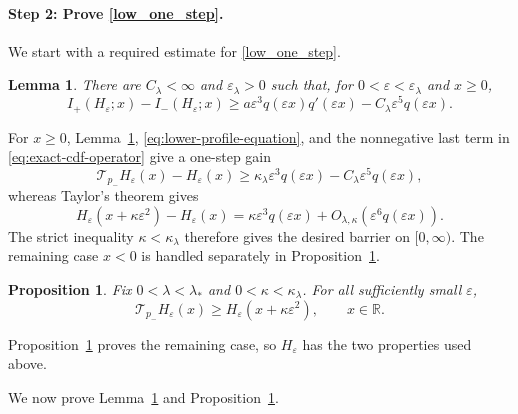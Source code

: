 \documentclass[12pt]{amsart}
\numberwithin{equation}{section}
\theoremstyle{plain}
\newtheorem{proposition}[theorem]{Proposition}
\newtheorem{lemma}[theorem]{Lemma}
\theoremstyle{definition}
\begin{document}
\paragraph*{Step 2: Prove \eqref{low_one_step}.}
We start with a required  estimate for \eqref{low_one_step}.

\begin{lemma}
\label{lem:hard-edge-consistency}
There are $C_{\lambda}<\infty$ and $\varepsilon_{\lambda}>0$ such that, for
$0<\varepsilon<\varepsilon_{\lambda}$ and $x\ge0$,
\begin{equation}
 I_+(H_\varepsilon;x)-I_-(H_\varepsilon;x)
 \ge a\varepsilon^3q(\varepsilon x)q'(\varepsilon x)
      -C_{\lambda}\varepsilon^5q(\varepsilon x).
 \label{eq:hard-edge-one-sided-consistency}
\end{equation}
\end{lemma}

For $x\ge0$, Lemma~\ref{lem:hard-edge-consistency},
\eqref{eq:lower-profile-equation}, and the nonnegative last term in
\eqref{eq:exact-cdf-operator} give a one-step gain
\[
 \mathcal T_{p_-}H_\varepsilon(x)-H_\varepsilon(x)
 \ge \kappa_{\lambda}\varepsilon^3q(\varepsilon x)
      -C_{\lambda}\varepsilon^5q(\varepsilon x),
\]
whereas Taylor's theorem gives
\[
 H_\varepsilon(x+\kappa\varepsilon^2)-H_\varepsilon(x)
 =\kappa\varepsilon^3q(\varepsilon x)
  +O_{\lambda,\kappa}(\varepsilon^6q(\varepsilon x)).
\]
The strict inequality $\kappa<\kappa_{\lambda}$ therefore gives the desired
barrier on $[0,\infty)$. The remaining case $x<0$ is handled separately in
Proposition~\ref{prop:hard-edge-barrier}.

\begin{proposition}
\label{prop:hard-edge-barrier}
Fix $0<\lambda<\lambda_*$ and $0<\kappa<\kappa_{\lambda}$.  For all sufficiently small
$\varepsilon$,
\begin{equation*}
 \mathcal T_{p_-}H_\varepsilon(x)
 \ge H_\varepsilon(x+\kappa\varepsilon^2),
 \qquad x\in\mathbb R.
\end{equation*}
\end{proposition}

Proposition~\ref{prop:hard-edge-barrier} proves the remaining case, so $H_\varepsilon$ has the two properties used above.

We now prove Lemma~\ref{lem:hard-edge-consistency} and Proposition~\ref{prop:hard-edge-barrier}.
\end{document}
